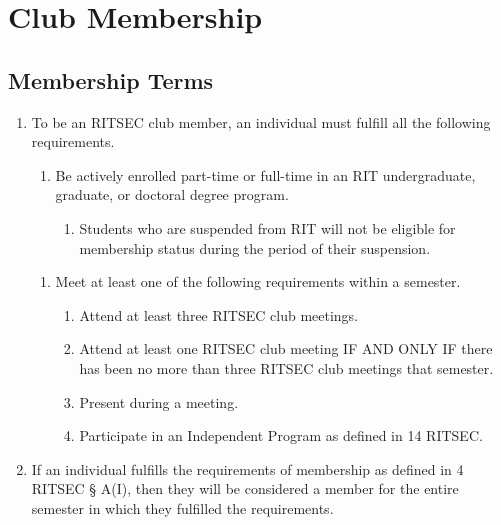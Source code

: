 
\section{Club Membership}

\subsection{Membership Terms}

\begin{enumerate}
  \item To be an RITSEC club member, an individual must fulfill all the
    following requirements.
  \begin{enumerate}
    \item Be actively enrolled part-time or full-time in an RIT undergraduate,
      graduate, or doctoral degree program.
    \begin{enumerate}
      \item Students who are suspended from RIT will not be eligible for
        membership status during the period of their suspension.
    \end{enumerate}
  \end{enumerate}
  \begin{enumerate}
    \item Meet at least one of the following requirements within a semester.
    \begin{enumerate}
      \item Attend at least three RITSEC club meetings.
      \item Attend at least one RITSEC club meeting IF AND ONLY IF there has
        been no more than three RITSEC club meetings that semester.
      \item Present during a meeting.
      \item Participate in an Independent Program as defined in 14 RITSEC.
    \end{enumerate}
  \end{enumerate}
  \item If an individual fulfills the requirements of membership as defined in
    4 RITSEC § A(I), then they will be considered a member for the entire
    semester in which they fulfilled the requirements.

\end{enumerate}
